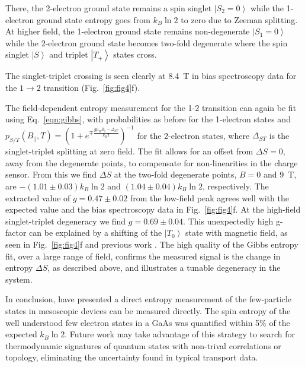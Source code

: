 \documentclass[twocolumn,showpacs,amsmath,amssymb,prl,aps,superscriptaddress]{revtex4-1}
\newcommand{\ket}[1]{\ensuremath{\left|#1\right\rangle}}
\begin{document}
There, the 2-electron ground state remains a spin singlet $\ket{S_2=0}$ while the 1-electron ground state entropy goes from $k_B\ln{2}$ to zero due to Zeeman splitting. 
At higher field, the 1-electron ground state remains non-degenerate $\ket{S_1=0}$ while the 2-electron ground state becomes two-fold degenerate where the spin singlet $\ket{S}$ and triplet $\ket{T_+}$ states cross. 

The singlet-triplet crossing is seen clearly at \SI{8.4}{\tesla} in bias spectroscopy data for the $1\rightarrow 2$ transition (Fig.~\ref{fig:fig4}f). 

The field-dependent entropy measurement for the 1-2 transition can again be fit using Eq.~\ref{eqn:gibbs}, with probabilities as before for the 1-electron states and $p_{S/T}(B_\parallel, T) = (1+ e^{\mp \frac{g\mu_B B_\parallel - \Delta_{ST}}{k_B T}})^{-1}$ for the 2-electron states, where $\Delta_{ST}$ is the singlet-triplet splitting at zero field. The fit allows for an offset from $\Delta S=0$, away from the degenerate points, to compensate for non-linearities in the charge sensor. From this we find $\Delta S$ at the two-fold degenerate points, $B=0$ and \SI{9}{\tesla}, are $-(1.01\pm0.03) k_B \ln{2}$ and $(1.04 \pm 0.04) k_B \ln{2}$, respectively. %
The extracted value of $g = 0.47 \pm 0.02$ from the low-field peak agrees well with the expected value and the bias spectroscopy data in Fig.~\ref{fig:fig4}f. At the high-field singlet-triplet degeneracy we find $g = 0.69 \pm 0.04$. This unexpectedly high g-factor can be explained by a shifting of the $\ket{T_0}$ state with magnetic field, as seen in Fig.~\ref{fig:fig4}f and previous work \cite{Szafran2004}. 
The high quality of the Gibbs entropy fit, over a large range of field, confirms the measured signal is the change in entropy $\Delta S$, as described above, and illustrates a tunable degeneracy in the system.

In conclusion, have presented a direct entropy measurement of the few-particle states in mesoscopic devices can be measured directly. The spin entropy of the well understood few electron states in a GaAs was quantified within 5\% of the expected $k_B \ln{2}$.  Future work may take advantage of this strategy to search for thermodynamic signatures of quantum states with non-trival correlations or topology, eliminating the uncertainty found in typical transport data.
\end{document}
